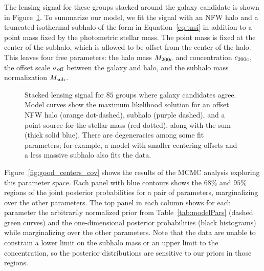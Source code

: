 \documentclass[12pt]{emulateapj}
\begin{document}
The lensing signal for these groups stacked around the galaxy
candidate is shown in Figure~\ref{fig:good_centers_ds}. To summarize
our model, we fit the signal with an NFW halo and a truncated
isothermal subhalo of the form in Equation~\eqref{eq:tnsi} in addition
to a point mass fixed by the photometric stellar mass. The point mass is
fixed at the center of the subhalo, which is allowed to be offset
from the center of the halo. This leaves four free parameters:
the halo mass $M_{\rm 200c}$ and concentration $c_{\rm 200c}$, the
offset scale $\sigma_{\rm off}$ between the galaxy and halo, and the
subhalo mass normalization $M_{\rm sub}$.

\begin{figure}[htb]
\caption{Stacked lensing signal for $85$ groups
  where galaxy candidates agree. Model curves show the maximum
  likelihood solution for an offset NFW halo (orange dot-dashed),
  subhalo (purple dashed), and a point source for the stellar
  mass (red dotted), along with the sum (thick solid blue). There are
  degeneracies among some fit parameters; for example, a model with
  smaller centering offsets and a less massive subhalo also fits the data.}
\label{fig:good_centers_ds}
\end{figure}
 
Figure~\ref{fig:good_centers_cov} shows the results of the MCMC analysis 
exploring this parameter
space. Each panel with blue contours shows the $68\%$ and $95\%$
regions of the joint posterior probabilities for a pair of parameters,
marginalizing over the other parameters. The top panel in each column
shows for each parameter the arbitrarily normalized prior from
Table~\ref{tab:modelPars} (dashed
green curves) and the one-dimensional posterior probabilities (black
histograms) while marginalizing over the other parameters. Note that
the data are unable to constrain a lower limit on the subhalo mass or
an upper limit to the concentration, so the posterior distributions
are sensitive to our priors in those regions.

\begin{figure*}[htb]
\caption{Posteriors for the four parameters of a general offset model
  discussed in the text, applied to the lensing signal from
  Figure~\ref{fig:good_centers_ds}. Blue contours show $68\%$ and
  $95\%$ regions for the pair of parameters noted along the axes,
  marginalized over the other parameters. White crosses mark the
  maximum likelihood parameters. Top panels show the
  posterior distributions for single parameters while marginalizing
  over the others (black histograms), along with arbitrarily
  normalized priors (green dashed curves).}
\label{fig:good_centers_cov}
\end{figure*}
\end{document}
